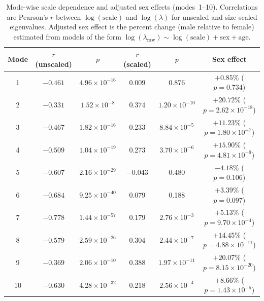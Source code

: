 \documentclass[openacc]{rsproca_new}
\begin{document}
\begin{table}[p]
\centering
\caption{Mode-wise scale dependence and adjusted sex effects (modes~1--10). Correlations are Pearson's $r$ between $\log(\mathrm{scale})$ and $\log(\lambda)$ for unscaled and size-scaled eigenvalues. Adjusted sex effect is the percent change (male relative to female) estimated from models of the form $\log(\lambda_{\mathrm{raw}}) \sim \log(\mathrm{scale}) + \mathrm{sex} + \mathrm{age}$.}
\label{tab:modes}
\begin{tabular}{cccccc}
\toprule
Mode & $r$ (unscaled) & $p$ & $r$ (scaled) & $p$ & Sex effect \\
\midrule
1  & $-0.461$ & $4.96 \times 10^{-16}$ & 0.009 & 0.876 & $+0.85\%$ ($p=0.734$) \\
2  & $-0.331$ & $1.52 \times 10^{-8}$  & 0.374 & $1.20 \times 10^{-10}$ & $+20.72\%$ ($p=2.62 \times 10^{-18}$) \\
3  & $-0.467$ & $1.82 \times 10^{-16}$ & 0.233 & $8.84 \times 10^{-5}$  & $+11.23\%$ ($p=1.80 \times 10^{-7}$) \\
4  & $-0.509$ & $1.04 \times 10^{-19}$ & 0.273 & $3.70 \times 10^{-6}$  & $+15.90\%$ ($p=4.81 \times 10^{-9}$) \\
5  & $-0.607$ & $2.16 \times 10^{-29}$ & $-0.043$ & 0.480 & $-4.18\%$ ($p=0.106$) \\
6  & $-0.684$ & $9.25 \times 10^{-40}$ & 0.079 & 0.188 & $+3.39\%$ ($p=0.097$) \\
7  & $-0.778$ & $1.44 \times 10^{-57}$ & 0.179 & $2.76 \times 10^{-3}$  & $+5.13\%$ ($p=9.70 \times 10^{-4}$) \\
8  & $-0.579$ & $2.59 \times 10^{-26}$ & 0.304 & $2.44 \times 10^{-7}$  & $+14.45\%$ ($p=4.88 \times 10^{-11}$) \\
9  & $-0.369$ & $2.06 \times 10^{-10}$ & 0.388 & $1.97 \times 10^{-11}$ & $+20.07\%$ ($p=8.15 \times 10^{-20}$) \\
10 & $-0.630$ & $4.28 \times 10^{-32}$ & 0.218 & $2.56 \times 10^{-4}$  & $+8.66\%$ ($p=1.43 \times 10^{-5}$) \\
\bottomrule
\end{tabular}
\end{table}
\end{document}
